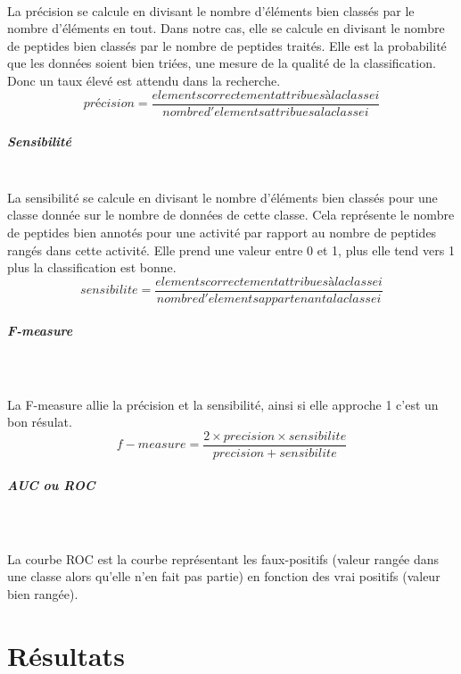 \documentclass[a4paper,10pt]{report}
\begin{document}
	     ~\\ 
	     La précision se calcule en divisant le nombre d'éléments bien classés par le nombre d'éléments en tout.
	     Dans notre cas, elle se calcule en divisant le nombre de peptides bien classés par le nombre de peptides traités.
	     Elle est la probabilité que les données soient bien triées, une mesure de la qualité de la classification. 
	     Donc un taux élevé est attendu dans la recherche.
	     \[ 
	      précision = \frac{ elements correctement attribues à la classe i }{ nombre d'elements attribues a la classe i }
	     \]

	     
	     \paragraph{Sensibilité}
	     
	     ~\\
	     La sensibilité se calcule en divisant le nombre d'éléments bien classés pour une classe donnée sur le nombre de données de cette classe. 
	     Cela représente le nombre de peptides bien annotés pour une activité par rapport au nombre de peptides rangés dans cette activité.
	     Elle prend une valeur entre 0 et 1, plus elle tend vers 1 plus la classification est bonne.
	     \[
	      sensibilite = \frac{ elements correctement attribues à la classe i }{ nombre d'elements appartenant a la classe i }
	     \]

	     \paragraph{F-measure}\\
	     
	     ~\\La F-measure allie la précision et la sensibilité, ainsi si elle approche 1 c'est un bon résulat.
	     \[
	      f-measure = \frac{ 2 \times precision \times sensibilite }{ precision + sensibilite }
	     \]
	     \paragraph{AUC ou ROC}\\
		
	     ~\\La courbe ROC est la courbe représentant les faux-positifs (valeur rangée dans une classe alors qu'elle n'en fait pas partie) en fonction des vrai positifs (valeur bien rangée).
	     
	 
   \chapter{Résultats}
      
\end{document}
